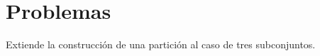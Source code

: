 \section*{Problemas}

\begin{problema}
	Extiende la construcción de una partición al caso de tres subconjuntos. 
\end{problema}